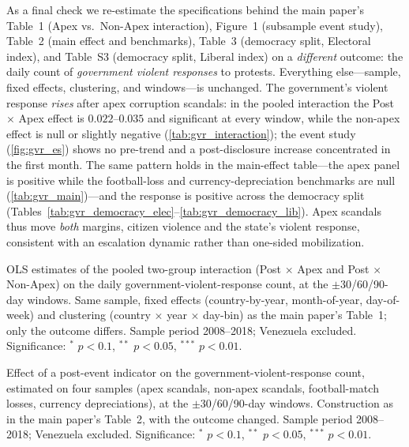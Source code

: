 \documentclass[11pt]{article}
\begin{document}
As a final check we re-estimate the specifications behind the main paper's Table~1 (Apex vs.\ Non-Apex interaction), Figure~1 (subsample event study), Table~2 (main effect and benchmarks), Table~3 (democracy split, Electoral index), and Table~S3 (democracy split, Liberal index) on a \emph{different} outcome: the daily count of \emph{government violent responses} to protests. Everything else---sample, fixed effects, clustering, and windows---is unchanged. The government's violent response \emph{rises} after apex corruption scandals: in the pooled interaction the Post $\times$ Apex effect is $0.022$--$0.035$ and significant at every window, while the non-apex effect is null or slightly negative (\autoref{tab:gvr_interaction}); the event study (\autoref{fig:gvr_es}) shows no pre-trend and a post-disclosure increase concentrated in the first month. The same pattern holds in the main-effect table---the apex panel is positive while the football-loss and currency-depreciation benchmarks are null (\autoref{tab:gvr_main})---and the response is positive across the democracy split (Tables~\ref{tab:gvr_democracy_elec}--\ref{tab:gvr_democracy_lib}). Apex scandals thus move \emph{both} margins, citizen violence and the state's violent response, consistent with an escalation dynamic rather than one-sided mobilization.

\begin{table}[htb!]
    \caption{Government violent response, Apex vs.\ Non-Apex interaction (specification of main-paper Table~1).}
    \label{tab:gvr_interaction}
    \begin{center}\scriptsize{}\end{center}
    \footnotesize{OLS estimates of the pooled two-group interaction (Post $\times$ Apex and Post $\times$ Non-Apex) on the daily government-violent-response count, at the $\pm$30/60/90-day windows. Same sample, fixed effects (country-by-year, month-of-year, day-of-week) and clustering (country $\times$ year $\times$ day-bin) as the main paper's Table~1; only the outcome differs. Sample period 2008--2018; Venezuela excluded. Significance: $^{*}$ $p<0.1$, $^{**}$ $p<0.05$, $^{***}$ $p<0.01$.}
\end{table}

\begin{table}[htb!]
    \caption{Government violent response, main effect and benchmarks (specification of main-paper Table~2).}
    \label{tab:gvr_main}
    \begin{center}\scriptsize{}\end{center}
    \footnotesize{Effect of a post-event indicator on the government-violent-response count, estimated on four samples (apex scandals, non-apex scandals, football-match losses, currency depreciations), at the $\pm$30/60/90-day windows. Construction as in the main paper's Table~2, with the outcome changed. Sample period 2008--2018; Venezuela excluded. Significance: $^{*}$ $p<0.1$, $^{**}$ $p<0.05$, $^{***}$ $p<0.01$.}
\end{table}
\end{document}
